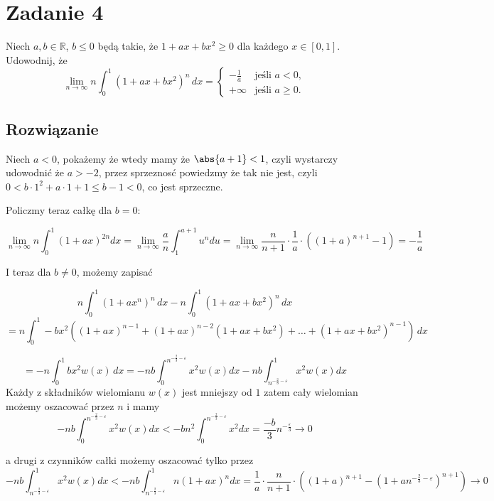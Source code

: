 \documentclass[11pt]{scrartcl}
\begin{document}
\section*{Zadanie 4}
Niech \(a, b \in \mathbb{R}\), \(b \leq 0\) będą takie, że \(1 + ax + bx^2 \geq 0\) dla każdego \(x \in [0, 1]\). Udowodnij, że
\[
\lim_{n \to \infty} n \int_0^1 (1 + ax + bx^2)^n \, dx = 
\begin{cases} 
-\frac{1}{a} & \text{jeśli } a < 0, \\ 
+\infty & \text{jeśli } a \geq 0. 
\end{cases}
\]

\subsection*{Rozwiązanie}

Niech $a < 0$, pokażemy że wtedy mamy że $\abs{a+1} < 1 $, czyli wystarczy udowodnić że $a > -2$, przez sprzeznosć powiedzmy że tak nie jest, czyli $0 < b \cdot 1^2 + a \cdot 1 + 1 \leq b - 1 < 0$, co jest sprzeczne.

Policzmy teraz całkę dla $b = 0$:

\[
  \lim_{n \to \infty } n \int_0^1 (1 + ax)^{2n} dx = \lim_{n \to \infty } \frac{a}{n} \int_1^{a + 1} u^n du  = \lim_{n \to \infty } \frac{n}{n+1} \cdot \frac{1}{a} \cdot ((1+a)^{n+1} - 1) = - \frac{1}{a}     
\]

I teraz dla $b \not = 0$, możemy zapisać

\[
n \int_{0}^{1} (1 + ax^n)^{n} \, dx - n \int_{0}^{1} (1 + ax + bx^2)^{n} \, dx
\]
\[
  = n \int_{0}^{1} -bx^2 \left ( (1+ax)^{n-1} + (1+ax)^{n-2}(1+ax+bx^2) + \dots + (1+ax+bx^2)^{n-1} \right ) \, dx
\]

\[
= -n \int_{0}^{1} bx^2 w(x) \, dx = -nb \int_0^{n^{-\frac{2}{3} - \varepsilon}} x^2 w(x)dx - nb \int_{n^{-\frac{2}{3} - \varepsilon}}^1 x^2 w(x) dx
\]
Każdy z składników wielomianu $w(x)$ jest mniejszy od $1$ zatem cały wielomian możemy oszacować przez $n$ i mamy
\[
  -nb \int_0^{n^{-\frac{2}{3} - \varepsilon}} x^2 w(x)dx < -b n^2 \int_0^{n^{-\frac{2}{3} - \varepsilon}} x^2 dx = \frac{-b}{3} n^{-\frac{\varepsilon}{3}} \to 0 
\]

a drugi z czynników całki możemy oszacować tylko przez 
\[
  - nb \int_{n^{-\frac{2}{3} - \varepsilon}}^1 x^2 w(x) dx < - nb \int_{n^{-\frac{2}{3} - \varepsilon}}^1 n(1+ax)^n dx = \frac{1}{a} \cdot \frac{n}{n+1} \cdot \left ( (1+a)^{n+1} - (1 + a n^{-\frac{2}{3} - \varepsilon})^{n+1} \right ) \to 0 
\]
\end{document}
